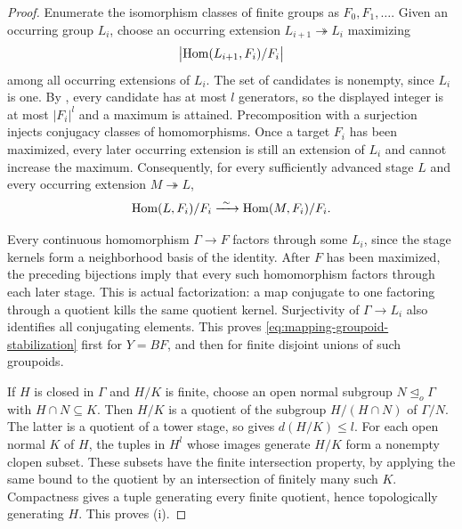 \begin{proof}
Enumerate the isomorphism classes of finite groups as $F_0,F_1,\ldots$.
Given an occurring group $L_i$, choose an occurring extension
$L_{i+1}\twoheadrightarrow L_i$ maximizing
\[
 \bigl|\operatorname{Hom}(L_{i+1},F_i)/F_i\bigr|
\]
among all occurring extensions of $L_i$.  The set of candidates is
nonempty, since $L_i$ is one.  By
, every candidate has at most $l$
generators, so the displayed integer is at most $|F_i|^l$ and a maximum
is attained.  Precomposition with a surjection injects conjugacy
classes of homomorphisms.  Once a target $F_i$ has been maximized, every
later occurring extension is still an extension of $L_i$ and cannot
increase the maximum.  Consequently, for every sufficiently advanced
stage $L$ and every occurring extension $M\twoheadrightarrow L$,
\begin{equation}\label{eq:maximal-hom-classes}
 \operatorname{Hom}(L,F_i)/F_i\xrightarrow{\ \sim\ }\operatorname{Hom}(M,F_i)/F_i.
\end{equation}

Every continuous homomorphism $\Gamma\to F$ factors through some
$L_i$, since the stage kernels form a neighborhood basis of the
identity.  After $F$ has been maximized, the preceding bijections imply
that every such homomorphism factors through each later stage.  This
is actual factorization: a map conjugate to one factoring through a
quotient kills the same quotient kernel.  Surjectivity of
$\Gamma\to L_i$ also identifies all conjugating elements.  This proves
\eqref{eq:mapping-groupoid-stabilization} first for $Y=BF$, and then
for finite disjoint unions of such groupoids.

If $H$ is closed in $\Gamma$ and $H/K$ is finite, choose an open normal
subgroup $N\trianglelefteq_o\Gamma$ with $H\cap N\subseteq K$.
Then $H/K$ is a quotient of the subgroup $H/(H\cap N)$ of $\Gamma/N$.
The latter is a quotient of a tower stage, so
 gives $d(H/K)\le l$.
For each open normal $K$ of $H$, the tuples in $H^l$ whose images
generate $H/K$ form a nonempty clopen subset.  These subsets have the
finite intersection property, by applying the same bound to the
quotient by an intersection of finitely many such $K$.  Compactness
gives a tuple generating every finite quotient, hence topologically
generating $H$.  This proves \textup{(i)}.


\end{proof}

